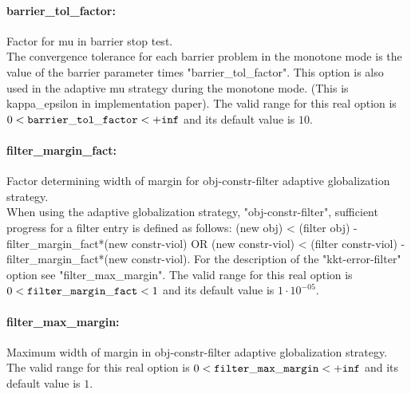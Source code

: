 \paragraph{barrier\_tol\_factor:}\label{sec:barrier_tol_factor} Factor for mu in barrier stop test. $\;$ \\
 The convergence tolerance for each barrier
problem in the monotone mode is the value of the
barrier parameter times "barrier\_tol\_factor".
This option is also used in the adaptive mu
strategy during the monotone mode. (This is
kappa\_epsilon in implementation paper). The valid range for this real option is 
$0 <  {\tt barrier\_tol\_factor } <  {\tt +inf}$
and its default value is $10$.


\paragraph{filter\_margin\_fact:}\label{sec:filter_margin_fact} Factor determining width of margin for obj-constr-filter adaptive globalization strategy. $\;$ \\
 When using the adaptive globalization strategy,
"obj-constr-filter", sufficient progress for a
filter entry is defined as follows: (new obj) <
(filter obj) - filter\_margin\_fact*(new
constr-viol) OR (new constr-viol) < (filter
constr-viol) - filter\_margin\_fact*(new
constr-viol).  For the description of the
"kkt-error-filter" option see
"filter\_max\_margin". The valid range for this real option is 
$0 <  {\tt filter\_margin\_fact } <  1$
and its default value is $1 \cdot 10^{-05}$.


\paragraph{filter\_max\_margin:}\label{sec:filter_max_margin} Maximum width of margin in obj-constr-filter adaptive globalization strategy. $\;$ \\
 The valid range for this real option is 
$0 <  {\tt filter\_max\_margin } <  {\tt +inf}$
and its default value is $1$.


